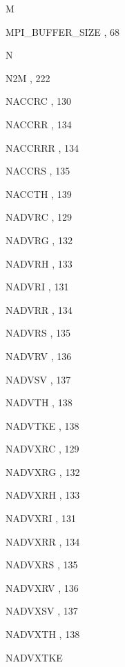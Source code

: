 \begin{theindex}
  \indexspace
M
  \item MPI\_BUFFER\_SIZE
    \subitem {},  68

  \indexspace
N
  \item N2M
    \subitem {},  222
  \item NACCRC
    \subitem {},  130
  \item NACCRR
    \subitem {},  134
  \item NACCRRR
    \subitem {},  134
  \item NACCRS
    \subitem {},  135
  \item NACCTH
    \subitem {},  139
  \item NADVRC
    \subitem {},  129
  \item NADVRG
    \subitem {},  132
  \item NADVRH
    \subitem {},  133
  \item NADVRI
    \subitem {},  131
  \item NADVRR
    \subitem {},  134
  \item NADVRS
    \subitem {},  135
  \item NADVRV
    \subitem {},  136
  \item NADVSV
    \subitem {},  137
  \item NADVTH
    \subitem {},  138
  \item NADVTKE
    \subitem {},  138
  \item NADVXRC
    \subitem {},  129
  \item NADVXRG
    \subitem {},  132
  \item NADVXRH
    \subitem {},  133
  \item NADVXRI
    \subitem {},  131
  \item NADVXRR
    \subitem {},  134
  \item NADVXRS
    \subitem {},  135
  \item NADVXRV
    \subitem {},  136
  \item NADVXSV
    \subitem {},  137
  \item NADVXTH
    \subitem {},  138
  \item NADVXTKE

\end{theindex}
